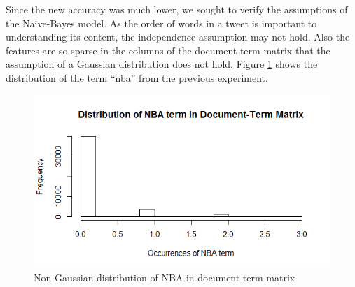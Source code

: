 \documentclass[journal, a4paper]{IEEEtran}
\begin{document}
Since the new accuracy was much lower, we sought to verify the assumptions of the Naive-Bayes model. As the order of words in a tweet is important to understanding its content, the independence assumption may not hold. Also the features are so sparse in the columns of the document-term matrix that the assumption of a Gaussian distribution does not hold. Figure \ref{fig:1} shows the distribution of the term “nba” from the previous experiment.
\begin{figure}[!hbt]
	\centering
	\includegraphics[width=\columnwidth]{nba.png}
	\caption{Non-Gaussian distribution of NBA in document-term matrix}
	\label{fig:1}
\end{figure}
\end{document}
